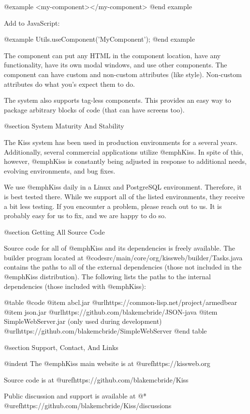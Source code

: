 @example
<my-component></my-component>
@end example

Add to JavaScript:

@example
Utils.useComponent('MyComponent');
@end example
    
The component can put any HTML in the component location, have any
functionality, have its own modal windows, and use other components.
The component can have custom and non-custom attributes (like style).
Non-custom attributes do what you's expect them to do.

The system also supports tag-less components.  This provides an easy
way to package arbitrary blocks of code (that can have screens too).

@section System Maturity And Stability

The Kiss system has been used in production environments for a several
years.  Additionally, several commercial applications utilize @emph{Kiss}.
In spite of this, however, @emph{Kiss} is constantly being adjusted
in response to additional needs, evolving environments, and bug fixes.

We use @emph{Kiss} daily in a Linux and PostgreSQL environment.
Therefore, it is best tested there.  While we support all of the listed
environments, they receive a bit less testing.  If you encounter a problem,
please reach out to us.  It is probably easy for us to fix, and we
are happy to do so.


@section Getting All Source Code

Source code for all of @emph{Kiss} and its dependencies is freely
available.  The builder program located at
@code{src/main/core/org/kissweb/builder/Tasks.java} contains the paths
to all of the external dependencies (those not included in the
@emph{Kiss} distribution).  The following lists the paths to the
internal dependencies (those included with @emph{Kiss}):

@table @code
@item abcl.jar
@url{https://common-lisp.net/project/armedbear}
@item json.jar
@url{https://github.com/blakemcbride/JSON-java}
@item SimpleWebServer.jar (only used during development)
@url{https://github.com/blakemcbride/SimpleWebServer}
@end table

@section Support, Contact, And Links

@indent
The @emph{Kiss} main website is at @uref{https://kissweb.org}

Source code is at @uref{https://github.com/blakemcbride/Kiss}

Public discussion and support is available at @* 
@uref{https://github.com/blakemcbride/Kiss/discussions}

